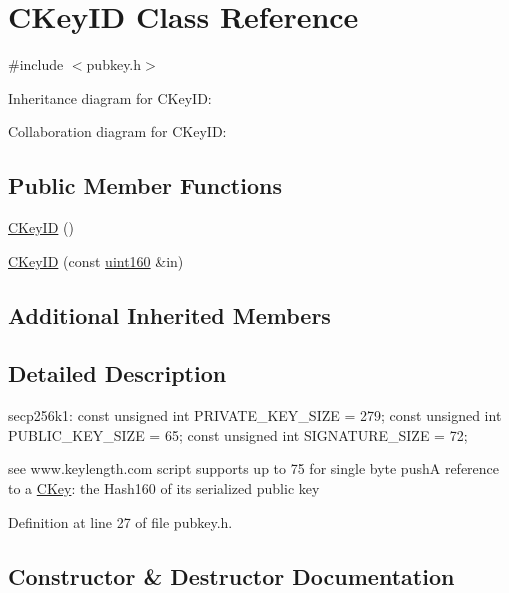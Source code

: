 \hypertarget{class_c_key_i_d}{}\section{C\+Key\+I\+D Class Reference}
\label{class_c_key_i_d}


{\ttfamily \#include $<$pubkey.\+h$>$}



Inheritance diagram for C\+Key\+I\+D\+:


Collaboration diagram for C\+Key\+I\+D\+:
\subsection*{Public Member Functions}
\begin{DoxyCompactItemize}
\item 
\hyperlink{class_c_key_i_d_a01dbd3c37820a2ffe89d106c6a7cf53d}{C\+Key\+I\+D} ()
\item 
\hyperlink{class_c_key_i_d_a695f373e11730318f9103100fa006a7e}{C\+Key\+I\+D} (const \hyperlink{classuint160}{uint160} \&in)
\end{DoxyCompactItemize}
\subsection*{Additional Inherited Members}


\subsection{Detailed Description}
secp256k1\+: const unsigned int P\+R\+I\+V\+A\+T\+E\+\_\+\+K\+E\+Y\+\_\+\+S\+I\+Z\+E = 279; const unsigned int P\+U\+B\+L\+I\+C\+\_\+\+K\+E\+Y\+\_\+\+S\+I\+Z\+E = 65; const unsigned int S\+I\+G\+N\+A\+T\+U\+R\+E\+\_\+\+S\+I\+Z\+E = 72;

see www.\+keylength.\+com script supports up to 75 for single byte push\+A reference to a \hyperlink{class_c_key}{C\+Key}\+: the Hash160 of its serialized public key 

Definition at line 27 of file pubkey.\+h.



\subsection{Constructor \& Destructor Documentation}
\hypertarget{class_c_key_i_d_a01dbd3c37820a2ffe89d106c6a7cf53d}{}
